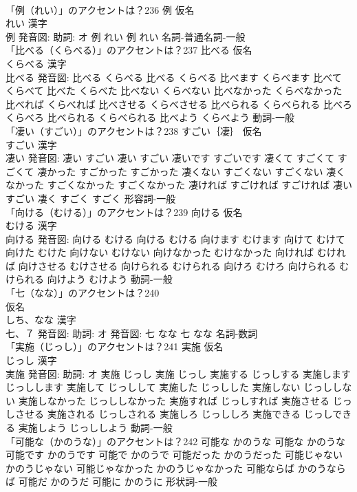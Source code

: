 \documentclass[8pt]{extreport}
\begin{document}
\begin{CJK}{UTF8}{min}
\\	「例（れい）」のアクセントは？236	例 仮名　
\\	れい 漢字　
\\	例 発音図: 助詞: オ	例 れい		例 れい				名詞-普通名詞-一般 
\\	「比べる（くらべる）」のアクセントは？237	比べる 仮名　
\\	くらべる 漢字　
\\	比べる 発音図:	比べる くらべる		比べる くらべる 比べます くらべます 比べて くらべて 比べた くらべた 比べない くらべない 比べなかった くらべなかった 比べれば くらべれば 比べさせる くらべさせる 比べられる くらべられる 比べろ くらべろ 比べられる くらべられる 比べよう くらべよう				動詞-一般 
\\	「凄い（すごい）」のアクセントは？238	すごい｛凄｝ 仮名　
\\	すごい 漢字　
\\	凄い 発音図:	凄い すごい		凄い すごい 凄いです すごいです 凄くて すごくて すごくて 凄かった すごかった すごかった 凄くない すごくない すごくない 凄くなかった すごくなかった すごくなかった 凄ければ すごければ すごければ 凄い すごい 凄く すごく すごく				形容詞-一般 
\\	「向ける（むける）」のアクセントは？239	向ける 仮名　
\\	むける 漢字　
\\	向ける 発音図:	向ける むける		向ける むける 向けます むけます 向けて むけて 向けた むけた 向けない むけない 向けなかった むけなかった 向ければ むければ 向けさせる むけさせる 向けられる むけられる 向けろ むけろ 向けられる むけられる 向けよう むけよう				動詞-一般 
\\	「七（なな）」のアクセントは？240	
\\	仮名　
\\	しち、なな 漢字　
\\	七、７ 発音図: 助詞: オ 発音図:	七 なな		七 なな				名詞-数詞 
\\	「実施（じっし）」のアクセントは？241	実施 仮名　
\\	じっし 漢字　
\\	実施 発音図: 助詞: オ	実施 じっし		実施 じっし 実施する じっしする 実施します じっしします 実施して じっしして 実施した じっしした 実施しない じっししない 実施しなかった じっししなかった 実施すれば じっしすれば 実施させる じっしさせる 実施される じっしされる 実施しろ じっししろ 実施できる じっしできる 実施しよう じっししよう				動詞-一般 
\\	「可能な（かのうな）」のアクセントは？242		可能な かのうな		可能な かのうな 可能です かのうです 可能で かのうで 可能だった かのうだった 可能じゃない かのうじゃない 可能じゃなかった かのうじゃなかった 可能ならば かのうならば 可能だ かのうだ 可能に かのうに				形状詞-一般 

\end{CJK}
\end{document}
